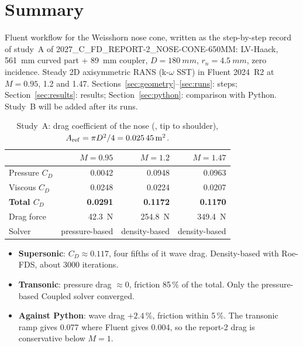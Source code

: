 \section{Summary}
\label{sec:summary}

Fluent workflow for the Weisshorn nose cone, written as the step-by-step record of study~A of
2027\_C\_FD\_REPORT-2\_NOSE-CONE-650MM: LV-Haack, \SI{561}{mm} curved part + \SI{89}{mm} coupler,
$D = \SI{180}{mm}$, $r_n = \SI{4.5}{mm}$, zero incidence. Steady 2D axisymmetric RANS (k-$\omega$ SST) in
Fluent 2024~R2 at $M = 0.95$, 1.2 and 1.47. Sections~\ref{sec:geometry}--\ref{sec:runs}: steps;
Section~\ref{sec:results}: results; Section~\ref{sec:python}: comparison with Python. Study~B will be
added after its runs.

\begin{table}[H]
\centering
\caption{Study~A: drag coefficient of the nose (, tip to shoulder),
$A_{\rm ref} = \pi D^2/4 = \SI{0.02545}{m^2}$.}
\label{tab:summary}
\small
\begin{tabular}{@{}lrrr@{}}
\toprule
 & $M = 0.95$ & $M = 1.2$ & $M = 1.47$ \\
\midrule
Pressure $C_D$ & 0.0042 & 0.0948 & 0.0963 \\
Viscous $C_D$ & 0.0248 & 0.0224 & 0.0207 \\
\textbf{Total $C_D$} & \textbf{0.0291} & \textbf{0.1172} & \textbf{0.1170} \\
Drag force & \SI{42.3}{N} & \SI{254.8}{N} & \SI{349.4}{N} \\
Solver & pressure-based & density-based & density-based \\
\bottomrule
\end{tabular}
\end{table}

\begin{itemize}
\item \textbf{Supersonic}: $C_D \approx 0.117$, four fifths of it wave drag. Density-based with Roe-FDS,
about 3000 iterations.
\item \textbf{Transonic}: pressure drag $\approx 0$, friction 85\,\% of the total. Only the pressure-based
Coupled solver converged.
\item \textbf{Against Python}: wave drag $+2.4\,\%$, friction within 5\,\%. The transonic ramp gives 0.077
where Fluent gives 0.004, so the report-2 drag is conservative below $M = 1$.
\end{itemize}
